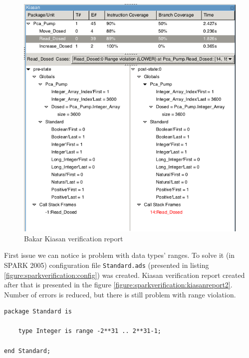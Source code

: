 \begin{figure}[ht]%
    \begin{center}
        \includegraphics[width=1.0\textwidth]{figures/pca-pump-verification-step1.png}
        \caption{Bakar Kiasan verification report}
    \end{center}
    \label{figure:sparkverification:kiasanreport1}
\end{figure}

First issue we can notice is problem with data types' ranges. To solve it (in SPARK 2005) configuration file \lstinline{Standard.ads} (presented in listing \ref{figure:sparkverification:config}) was created. Kiasan verification report created after that is presented in the figure \ref{figure:sparkverification:kiasanreport2}. Number of errors is reduced, but there is still problem with range violation.

\singlespacing
\begin{lstlisting}
package Standard is

    type Integer is range -2**31 .. 2**31-1;

end Standard;
\end{lstlisting}
\label{figure:sparkverification:config}
\doublespacing

